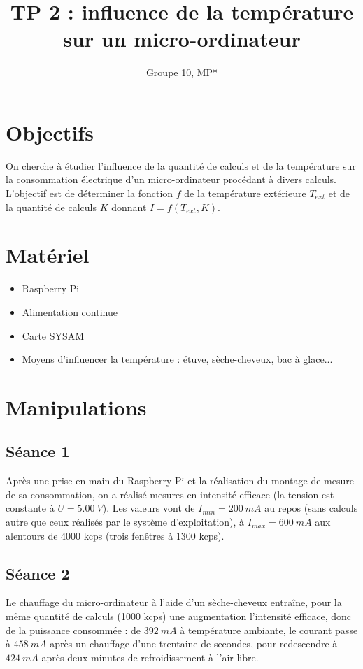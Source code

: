 \documentclass[french]{article}
\title{TP 2 : influence de la température\\
sur un micro-ordinateur}
\author{Groupe 10, MP*}
\begin{document}
\maketitle

\section{Objectifs}

On cherche à étudier l'influence de la quantité de calculs et de la température sur la consommation électrique d'un micro-ordinateur procédant à divers calculs. L'objectif est de déterminer la fonction $f$ de la température extérieure $T_{ext}$ et de la quantité de calculs $K$ donnant $I = f(T_{ext}, K)$.

\section{Matériel}

\begin{itemize}
    \item Raspberry Pi
    \item Alimentation continue
    \item Carte SYSAM
    \item Moyens d'influencer la température : étuve, sèche-cheveux, bac à glace...
\end{itemize}

\section{Manipulations}

\subsection{Séance 1}

Après une prise en main du Raspberry Pi et la réalisation du montage de mesure de sa consommation, on a réalisé mesures en intensité efficace (la tension est constante à $U = \SI{5,00}{V}$). Les valeurs vont de $I_{min} = \SI{200}{mA}$ au repos (sans calculs autre que ceux réalisés par le système d'exploitation), à $I_{max} = \SI{600}{mA}$ aux alentours de 4000 kcps (trois fenêtres à 1300 kcps).

\subsection{Séance 2}

Le chauffage du micro-ordinateur à l'aide d'un sèche-cheveux entraîne, pour la même quantité de calculs (1000 kcps) une augmentation l'intensité efficace, donc de la puissance consommée : de $\SI{392}{mA}$ à température ambiante, le courant passe à $\SI{458}{mA}$ après un chauffage d'une trentaine de secondes, pour redescendre à $\SI{424}{mA}$ après deux minutes de refroidissement à l'air libre.
\end{document}

